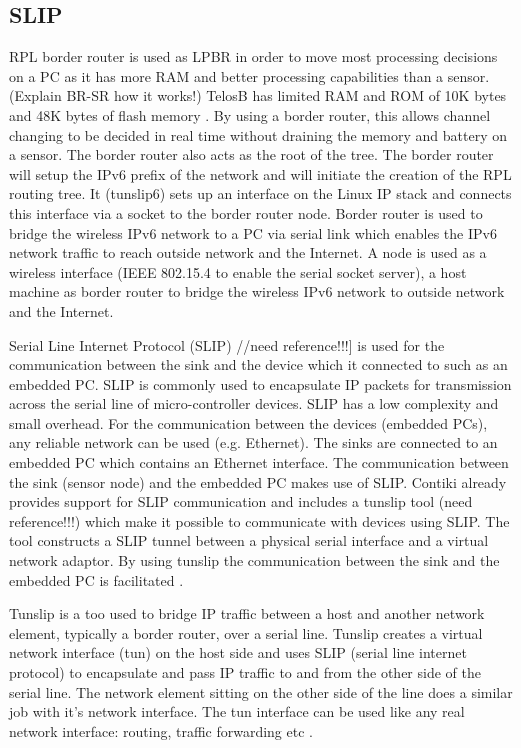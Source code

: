 \subsection{SLIP}
RPL border router is used as LPBR in order to move most processing decisions on a PC as it has more RAM and better processing capabilities than a sensor. (Explain BR-SR how it works!)
TelosB has limited RAM and ROM of 10K bytes and 48K bytes of flash memory \cite{telosb-datasheet}. By using a border router, this allows channel changing to be decided in real time without draining the memory and battery on a sensor. The border router also acts as the root of the tree. The border router will setup the IPv6 prefix of the network and will initiate the creation of the RPL routing tree.
It (tunslip6) sets up an interface on the Linux IP stack and connects this interface via a socket to the border router node.
Border router is used to bridge the wireless IPv6 network to a PC via serial link which enables the IPv6 network traffic to reach outside network and the Internet.
A node is used as a wireless interface (IEEE 802.15.4 to enable the serial socket server), a host machine as border router to bridge the wireless IPv6 network to outside network and the Internet.

Serial Line Internet Protocol (SLIP) //need reference!!!] is used for the communication between the sink and the device which it connected to such as an embedded PC. SLIP is commonly used to encapsulate IP packets for transmission across the serial line of micro-controller devices. SLIP has a low complexity and small overhead. For the communication between the devices (embedded PCs), any reliable network can be used (e.g. Ethernet). The sinks are connected to an embedded PC which contains an Ethernet interface. The communication between the sink (sensor node) and the embedded PC makes use of SLIP. Contiki already provides support for SLIP communication and includes a tunslip tool (need reference!!!) which make it possible to communicate with devices using SLIP. The tool constructs a SLIP tunnel between a physical serial interface and a virtual network adaptor. By using tunslip the communication between the sink and the embedded PC is facilitated \cite{multipleSinks}.

Tunslip is a too used to bridge IP traffic between a host and another network element, typically a border router, over a serial line. Tunslip creates a virtual network interface (tun) on the host side and uses SLIP (serial line internet protocol) to encapsulate and pass IP traffic to and from the other side of the serial line. The network element sitting on the other side of the line does a similar job with it's network interface. The tun interface can be used like any real network interface: routing, traffic forwarding etc \cite{tunslip}.

